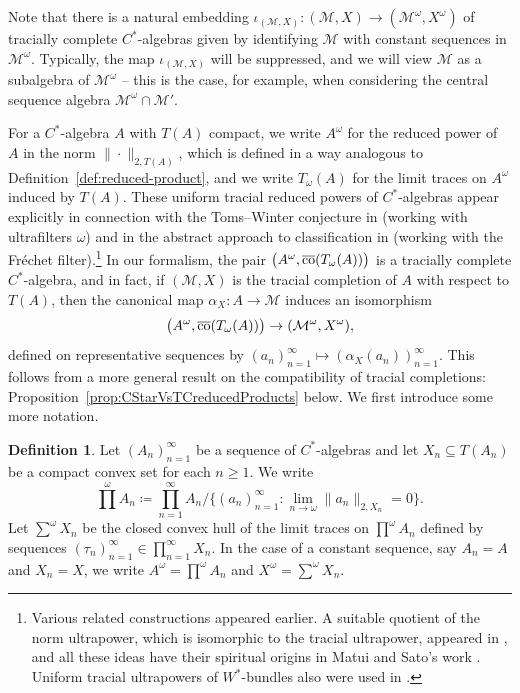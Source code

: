 \documentclass[a4paper,11pt]{amsart}
\theoremstyle{definition}
\newtheorem{definition}[theorem]{Definition}
\numberwithin{equation}{section}
\numberwithin{theorem}{section}
\newcommand{\M}{\mathcal{M}}
\begin{document}
Note that there is a natural embedding $\iota_{(\M, X)} \colon (\M, X) \rightarrow (\M^\omega, X^\omega)$ of tracially complete $C^*$-algebras given by identifying $\M$ with constant sequences in $\M^\omega$. Typically, the map $\iota_{(\M, X)}$ will be suppressed, and we will view $\M$ as a subalgebra of $\M^\omega$ -- this is the case, for example, when considering the central sequence algebra $\M^\omega \cap \M'$.

For a $C^*$-algebra $A$ with $T(A)$ compact, we write $A^\omega$ for the reduced power of $A$ in the norm $\|\cdot\|_{2, T(A)}$, which is defined in a way analogous to Definition~\ref{def:reduced-product}, and we write $T_\omega(A)$ for the limit traces on $A^\omega$ induced by $T(A)$.  These uniform tracial reduced powers of $C^*$-algebras appear explicitly in connection with the Toms--Winter conjecture in \cite{CETWW} (working with ultrafilters $\omega$) and in the abstract approach to classification in \cite{CGSTW} (working with the Fr\'echet filter).\footnote{Various  related constructions appeared earlier.  A suitable quotient of the norm ultrapower, which is isomorphic to the tracial ultrapower, appeared in \cite{KR14, TWW15}, and all these ideas have their spiritual origins in Matui and Sato's work \cite{MS12,MS14}.  Uniform tracial ultrapowers of $W^*$-bundles also were used in \cite{BBSTWW}.}
In our formalism, the pair $\big(A^\omega, \overline{\rm co}(T_\omega(A))\big)$ is a tracially complete $C^*$-algebra, and in fact, if $(\M, X)$ is the tracial completion of $A$ with respect to $T(A)$, then the canonical map $\alpha_X \colon A \rightarrow \M$ induces an isomorphism
\begin{equation}
  \big(A^\omega, \overline{\rm co}(T_\omega(A))\big) \rightarrow (\M^\omega, X^\omega),
\end{equation}
defined on representative sequences by $(a_n)_{n=1}^\infty  \mapsto (\alpha_X(a_n))_{n=1}^\infty$.
This follows from a more general result on the compatibility of tracial completions: Proposition~\ref{prop:CStarVsTCreducedProducts} below.  We first introduce some more notation.

\begin{definition}
Let $(A_n)_{n=1}^\infty$ be a sequence of $C^*$-algebras and let $X_n \subseteq T(A_n)$ be a compact convex set for each $n \geq 1$. We write
\begin{equation}
\prod^\omega A_n \coloneqq  \prod_{n=1}^\infty A_n \big/ \big\{(a_n)_{n=1}^\infty: \lim_{n\to\omega} \|a_n\|_{2,X_n} = 0\big\}.
\end{equation}
Let $\sum^\omega X_n$ be the closed convex hull of the limit traces on $\prod^\omega A_n$ defined by sequences $(\tau_n)_{n=1}^\infty \in \prod_{n=1}^\infty X_n$.  In the case of a constant sequence, say $A_n = A$ and $X_n = X$, we write $A^\omega = \prod^\omega A_n$ and $X^\omega = \sum^\omega X_n$. 
\end{definition}
\end{document}
